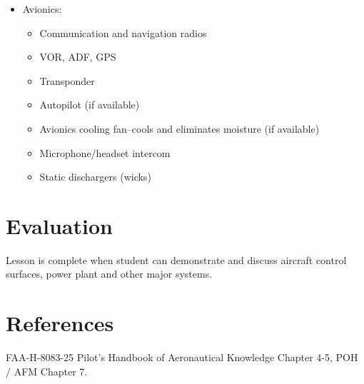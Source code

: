 \documentclass[twoside,openright]{report}
\begin{document}
\begin{itemize}
  \item Avionics:
    \begin{itemize}
      \item Communication and navigation radios

      \item VOR, ADF, GPS

      \item Transponder

      \item Autopilot (if available)

      \item Avionics cooling fan--cools and eliminates moisture (if available)

      \item Microphone/headset intercom

      \item Static dischargers (wicks)
    \end{itemize}
\end{itemize}

\section{Evaluation}

Lesson is complete when student can demonstrate and discuss aircraft control
surfaces, power plant and other major systems.

\section{References}

FAA-H-8083-25 Pilot's Handbook of Aeronautical Knowledge Chapter 4-5, POH / AFM
Chapter 7.
\end{document}

